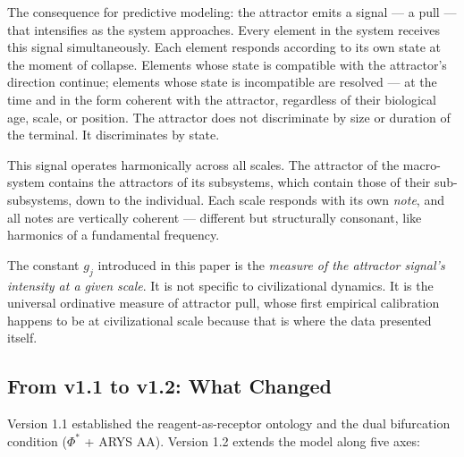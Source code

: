 \documentclass[12pt,a4paper]{article}
\newcommand{\gj}{g_j}
\newcommand{\Phistar}{\Phi^{*}}
\begin{document}
The consequence for predictive modeling: the attractor emits a signal --- a pull --- that intensifies as the system approaches. Every element in the system receives this signal simultaneously. Each element responds according to its own state at the moment of collapse. Elements whose state is compatible with the attractor's direction continue; elements whose state is incompatible are resolved --- at the time and in the form coherent with the attractor, regardless of their biological age, scale, or position. The attractor does not discriminate by size or duration of the terminal. It discriminates by state.

This signal operates harmonically across all scales. The attractor of the macro-system contains the attractors of its subsystems, which contain those of their sub-subsystems, down to the individual. Each scale responds with its own \emph{note}, and all notes are vertically coherent --- different but structurally consonant, like harmonics of a fundamental frequency.

The constant $\gj$ introduced in this paper is the \emph{measure of the attractor signal's intensity at a given scale}. It is not specific to civilizational dynamics. It is the universal ordinative measure of attractor pull, whose first empirical calibration happens to be at civilizational scale because that is where the data presented itself.

\subsection{From v1.1 to v1.2: What Changed}

Version 1.1 established the reagent-as-receptor ontology and the dual bifurcation condition ($\Phistar$ + ARYS AA). Version 1.2 extends the model along five axes:
\end{document}
